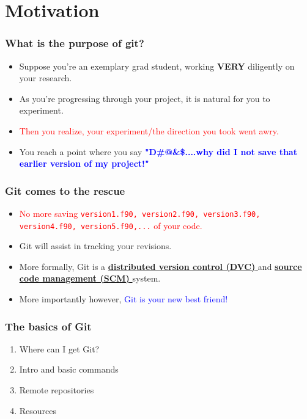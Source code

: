 \section{
  Motivation
}
%
%
\begin{frame}
	\frametitle{
	What is the purpose of git?
	}
	\begin{itemize}%
	\item
          Suppose you're an exemplary grad student, working {\bf VERY} diligently on your research.
        \item
          As you're progressing through your project, it is natural for you to experiment.
        \item
          \textcolor{red}{Then you realize, your experiment/the direction you took went awry.}
        \item
          You reach a point where you say \textcolor{blue}{\bf "D\#@\&\$....why did I not save that earlier version of my project!"}
	\end{itemize}
\end{frame}
%
%
\begin{frame}[fragile]
	\frametitle{
	Git comes to the rescue
	}
	\begin{itemize}%
	\item
          \textcolor{red}{
            No more saving {\tt version1.f90, version2.f90, version3.f90, version4.f90, version5.f90,...} of your code.
          }
        \item
          Git will assist in tracking your revisions. 
	\item
          More formally, Git is a \href{
            http://en.wikipedia.org/wiki/Distributed\_revision\_control}{
            \bf distributed version control (DVC)
          }
          and \href{
            http://en.wikipedia.org/wiki/Revision\_control}{
            \bf source code management (SCM)
          } system.
        \item
          More importantly however, \textcolor{blue}{Git is your new best friend!}
	\end{itemize}
\end{frame}
%
%
\begin{frame}
  \frametitle{
    \bf The basics of Git
  }
  \begin{enumerate}%
  \item
    Where can I get Git?
  \item
    Intro and basic commands
  \item
    Remote repositories
  \item
    Resources
  \end{enumerate}
\end{frame}
